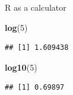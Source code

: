 \documentclass[ignorenonframetext,]{beamer}
\newenvironment{Shaded}{\begin{snugshade}}{\end{snugshade}}
\newcommand{\DecValTok}[1]{\textcolor[rgb]{0.00,0.00,0.81}{#1}}
\newcommand{\KeywordTok}[1]{\textcolor[rgb]{0.13,0.29,0.53}{\textbf{#1}}}
\newcommand{\NormalTok}[1]{#1}
\begin{document}
\begin{frame}[fragile]{R as a calculator}
\protect\hypertarget{r-as-a-calculator-3}{}

\begin{Shaded}
\begin{Highlighting}[]
\KeywordTok{log}\NormalTok{(}\DecValTok{5}\NormalTok{)}
\end{Highlighting}
\end{Shaded}

\begin{verbatim}
## [1] 1.609438
\end{verbatim}

\begin{Shaded}
\begin{Highlighting}[]
\KeywordTok{log10}\NormalTok{(}\DecValTok{5}\NormalTok{)}
\end{Highlighting}
\end{Shaded}

\begin{verbatim}
## [1] 0.69897
\end{verbatim}

\end{frame}
\end{document}
